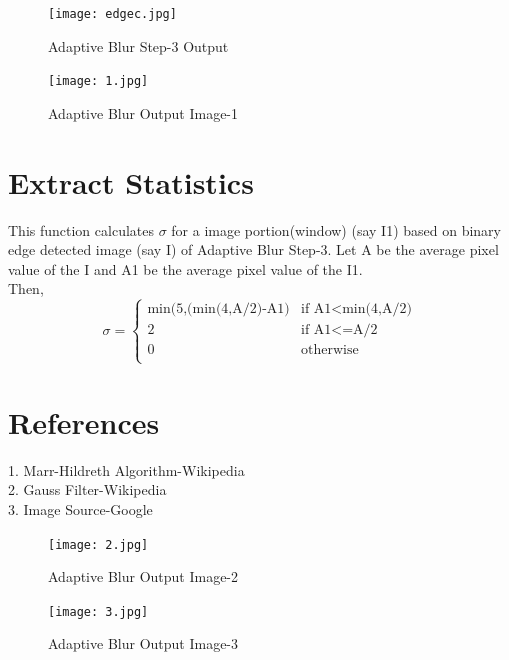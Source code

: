 \documentclass[extendedabs]{bmvc2k}
\begin{document}
\begin{figure}[t]
\texttt{[image: edgec.jpg]}
\caption{
Adaptive Blur Step-3 Output}
\vspace{-2mm}
\end{figure}

\begin{figure}[t]
\texttt{[image: 1.jpg]}
\caption{
Adaptive Blur Output Image-1}
\vspace{-2mm}
\end{figure}



\section{Extract Statistics}
This function calculates $\sigma$ for a image portion(window) (say I1) based on binary edge detected image (say I) of Adaptive Blur Step-3. Let A be the average pixel value of the I and A1 be the average pixel value of the I1.\\Then,
 \[ \sigma=
    \begin{cases}
    \text{min(5,(min(4,A/2)-A1)}&\text{if A1<min(4,A/2)}\\
    2&\text{if A1<=A/2}\\
    0&\text{otherwise}\\
    \end{cases}
    \]
    
\section{References}
1. Marr-Hildreth Algorithm-Wikipedia\\
2. Gauss Filter-Wikipedia\\
3. Image Source-Google

\begin{figure}[t]
\texttt{[image: 2.jpg]}
\caption{
Adaptive Blur Output Image-2}
\vspace{-2mm}
\end{figure}

\begin{figure}[t]
\texttt{[image: 3.jpg]}
\caption{
Adaptive Blur Output Image-3}
\vspace{-2mm}
\end{figure}
\end{document}
